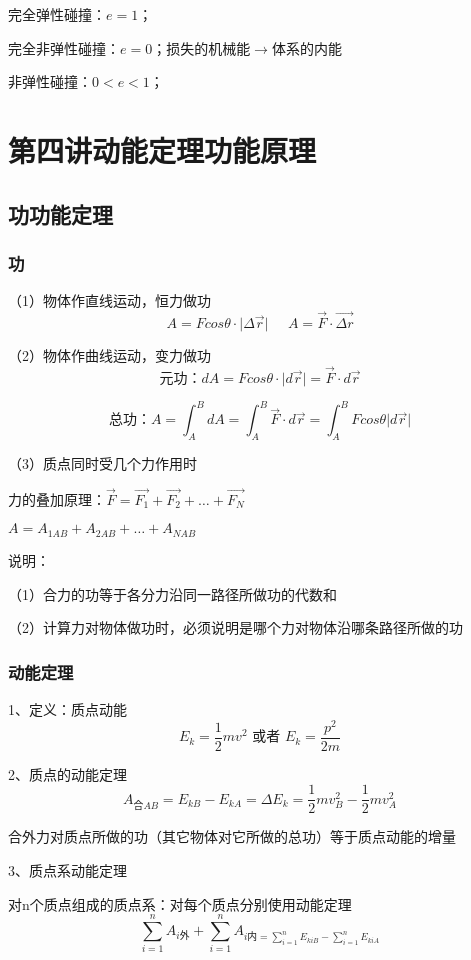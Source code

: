 \documentclass[UTF8]{article}
\begin{document}
    完全弹性碰撞：$e = 1$；

    完全非弹性碰撞：$e = 0$；损失的机械能$\rightarrow$体系的内能

    非弹性碰撞：$0<e<1$；

\newpage
\section{第四讲\;\;动能定理\;\;功能原理}
\subsection{功\;\;功能定理}
\subsubsection{功}

    （1）物体作直线运动，恒力做功
    \[A = Fcos\theta \cdot \lvert \Delta \vec{r} \vert\;\;\;\;\;A = \vec{F}\cdot\vec{\Delta r}\]

    （2）物体作曲线运动，变力做功
    \[\mbox{元功：}dA = Fcos\theta\cdot\lvert d\vec{r}\vert = \vec{F}\cdot d\vec{r}\]

    \[\mbox{总功：}A = \int_A^BdA = \int_A^B\vec{F}\cdot d\vec{r} = \int_A^BFcos\theta \lvert d\vec{r}\vert\]

    （3）质点同时受几个力作用时

    力的叠加原理：$\vec{F} = \vec{F_1} + \vec{F_2} + \dots + \vec{F_N}$

    \;\;\;\;\;\;\;\;\;\;\;\;\;\;\;\;\;\;\;\;$A = A_{1AB} + A_{2AB} + \dots + A_{NAB}$

    说明：

    \;\;（1）合力的功等于各分力沿同一路径所做功的代数和

    \;\;（2）计算力对物体做功时，必须说明是哪个力对物体沿哪条路径所做的功

\subsubsection{动能定理}

    1、定义：质点动能\[E_k = \frac{1}{2}mv^2\mbox{ 或者 }E_k = \frac{p^2}{2m}\]

    2、质点的动能定理\[A_{\mbox{合}AB} = E_{kB} - E_{kA} = \Delta E_k = \frac{1}{2}mv_B^2 - \frac{1}{2}mv_A^2\]

    \;\;合外力对质点所做的功（其它物体对它所做的总功）等于质点动能的增量

    3、质点系动能定理

    对n个质点组成的质点系：对每个质点分别使用动能定理
    \[\sum_{i=1}^n A_{i\mbox{外}} + \sum_{i=1}^n A_{i\mbox{内} = \sum_{i=1}^n E_{kiB} - \sum_{i=1}^n E_{kiA}}\]
\end{document}
